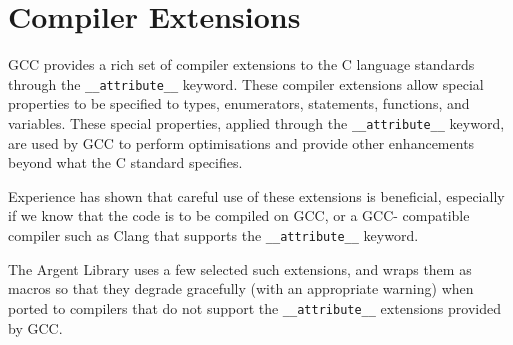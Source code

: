 \chapter{Compiler Extensions}

GCC provides a rich set of compiler extensions to the C language standards
through the \texttt{\_\_attribute\_\_} keyword. These compiler extensions allow 
special properties to be specified to types, enumerators, statements, functions, 
and variables. These special properties, applied through the 
\texttt{\_\_attribute\_\_} keyword, are used by GCC to perform optimisations and
provide other enhancements beyond what the C standard specifies.

Experience has shown that careful use of these extensions is beneficial,
especially if we know that the code is to be compiled on GCC, or a GCC-
compatible compiler such as Clang that supports the 
\texttt{\_\_attribute\_\_} keyword.

The Argent Library uses a few selected such extensions, and wraps them as macros
so that they degrade gracefully (with an appropriate warning) when ported to 
compilers that do not support the \texttt{\_\_attribute\_\_} extensions provided
 by GCC.

